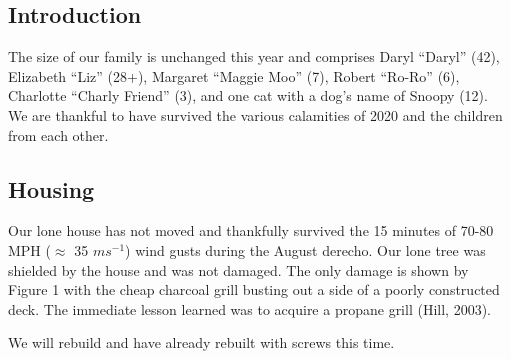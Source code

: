 \documentclass[letterpaper,11pt]{article}
\makeatletter
\newenvironment{figurehere}
  {\def\@captype{figure}}
  {}
\makeatother
\begin{document}
\begin{multicols}{2}

\section{Introduction} 

The size of our family is unchanged this year and comprises Daryl
\enquote{Daryl} (42), Elizabeth \enquote{Liz} (28+),
Margaret \enquote{Maggie Moo} (7), Robert \enquote{Ro-Ro} (6), Charlotte
 \enquote{Charly Friend} (3), and one cat with a dog's name of Snoopy (12). 
We are thankful to have survived the various calamities of 2020 and the
children from each other.
   
\subsection{Housing}

Our lone house has not moved and thankfully survived the 15 minutes of 
70-80 MPH ($\approx$ 35 $m s^{-1}$)
wind gusts during the August derecho.  Our lone tree was shielded by the house
and was not damaged. The only damage is shown by Figure 1 with
the cheap charcoal grill busting out a side of a poorly constructed deck.
The immediate lesson learned was to acquire a propane grill (Hill, 2003).

\bigskip

\begin{figurehere}
    \centering   
    \caption{We will rebuild and have already rebuilt with screws this time.}
\end{figurehere}


\end{multicols}
\end{document}
